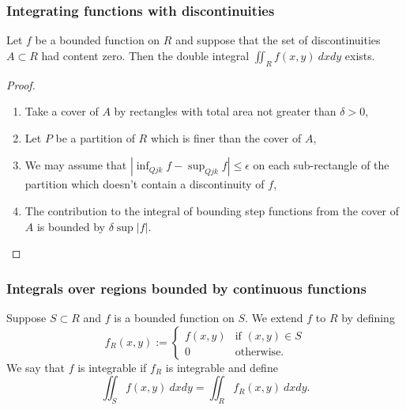\documentclass[aspectratio=169,handout]{beamer}
\newcommand{\abs}[1]{\left|#1\right|} %
\begin{document}
\begin{frame}
    \frametitle{Integrating functions with discontinuities}

    \begin{theorem}
        Let \(f\) be a bounded function on \(R\) and suppose that the set of discontinuities \(A\subset R\) had content zero. Then the double integral \(\iint_{R}f(x,y) \ dxdy\) exists.
    \end{theorem}
    \begin{proof}
        \begin{enumerate}
            \item Take a cover of \(A\) by rectangles with total area not greater than \(\delta>0\),
            \item Let \(P\) be a partition of \(R\) which is finer than the cover of \(A\),
            \item We may assume that \(\abs{\inf_{Q{jk}} f - \sup_{Q{jk}} f }\leq \epsilon\)  on each sub-rectangle of the partition which doesn't contain a discontinuity of \(f\),
            \item The contribution to the integral of bounding step functions from the cover of \(A\) is bounded by \(\delta \sup \abs{f}\).
        \end{enumerate}
    \end{proof}


\end{frame}



\begin{frame}
    \frametitle{Integrals over regions bounded by continuous functions}


    \begin{definition}
        Suppose \(S\subset R\) and \(f\) is a bounded function on \(S\).
        We extend \(f\) to \(R\) by defining
        \[
            f_R(x,y) := \begin{cases}
                f(x,y) & \text{if \((x,y)\in S\)} \\
                0      & \text{otherwise}.
            \end{cases}
        \]
        We say that \(f\) is integrable if \(f_{R}\) is integrable and define
        \[
            \iint_{S} f(x,y) \ dxdy = \iint_{R} f_{R}(x,y) \ dx dy.
        \]
    \end{definition}

\end{frame}
\end{document}
